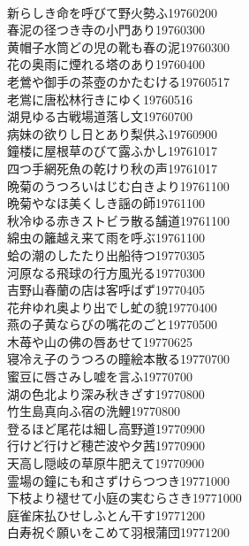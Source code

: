 \begin{multicols}{2}
\\新らしき命を呼びて野火勢ふ\hfill{19760200}
\\春泥の径つき寺の小門あり\hfill{19760300}
\\黄帽子水筒どの児の靴も春の泥\hfill{19760300}
\\花の奥雨に煙れる塔のあり\hfill{19760400}
\\老鶯や御手の茶壺のかたむける\hfill{19760517}
\\老鴬に唐松林行きにゆく\hfill{19760516}
\\湖見ゆる古戦場道落し文\hfill{19760700}
\\病妹の欲りし日とあり梨供ふ\hfill{19760900}
\\鐘楼に屋根草のびて露ふかし\hfill{19761017}
\\四つ手網死魚の乾けり秋の声\hfill{19761017}
\\晩菊のうつろいはじむ白きより\hfill{19761100}
\\晩菊やなほ美くしき謡の師\hfill{19761100}
\\秋冷ゆる赤きストビラ散る舗道\hfill{19761100}
\\綿虫の籬越え来て雨を呼ぶ\hfill{19761100}
\\蛤の潮のしたたり出船待つ\hfill{19770305}
\\河原なる飛球の行方風光る\hfill{19770300}
\\吉野山春蘭の店は客呼ばず\hfill{19770405}
\\花弁ゆれ奥より出でし虻の貌\hfill{19770400}
\\燕の子黄ならびの嘴花のごと\hfill{19770500}
\\木苺や山の佛の唇あせて\hfill{19770625}
\\寝冷え子のうつろの瞳絵本散る\hfill{19770700}
\\蜜豆に唇さみし嘘を言ふ\hfill{19770700}
\\湖の色北より深み秋きざす\hfill{19770800}
\\竹生島真向ふ宿の洗鯉\hfill{19770800}
\\登るほど尾花は細し高野道\hfill{19770900}
\\行けど行けど穂芒波や夕茜\hfill{19770900}
\\天高し隠岐の草原牛肥えて\hfill{19770900}
\\霊場の鐘にも和さずけらつつき\hfill{19771000}
\\下枝より褪せて小庭の実むらさき\hfill{19771000}
\\庭雀床払ひせしふとん干す\hfill{19771200}
\\白寿祝ぐ願いをこめて羽根蒲団\hfill{19771200}

\end{multicols}
